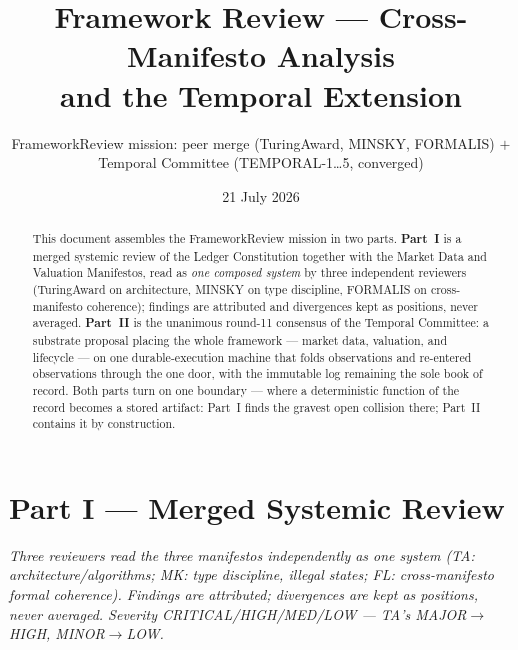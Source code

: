 \documentclass[11pt,a4paper]{article}
\title{\textbf{Framework Review --- Cross-Manifesto Analysis\\
and the Temporal Extension}}
\author{FrameworkReview mission: peer merge (TuringAward, MINSKY, FORMALIS)
$+$ Temporal Committee (TEMPORAL-1\ldots5, converged)}
\date{21 July 2026}
\begin{document}
\maketitle

\begin{abstract}
\noindent This document assembles the FrameworkReview mission in two parts. \textbf{Part~I} is a
merged systemic review of the Ledger Constitution together with the Market Data and Valuation
Manifestos, read as \emph{one composed system} by three independent reviewers (TuringAward on
architecture, MINSKY on type discipline, FORMALIS on cross-manifesto coherence); findings are
attributed and divergences kept as positions, never averaged. \textbf{Part~II} is the unanimous
round-11 consensus of the Temporal Committee: a substrate proposal placing the whole framework ---
market data, valuation, and lifecycle --- on one durable-execution machine that folds observations
and re-entered observations through the one door, with the immutable log remaining the sole book of
record. Both parts turn on one boundary --- where a deterministic function of the record becomes a
stored artifact: Part~I finds the gravest open collision there; Part~II contains it by construction.
\end{abstract}


\section*{Part I --- Merged Systemic Review}

\noindent\emph{Three reviewers read the three manifestos independently as one system (TA:
architecture/algorithms; MK: type discipline, illegal states; FL: cross-manifesto formal
coherence). Findings are attributed; divergences are kept as positions, never averaged.
Severity CRITICAL/HIGH/MED/LOW --- TA's MAJOR$\to$HIGH, MINOR$\to$LOW.}
\end{document}
